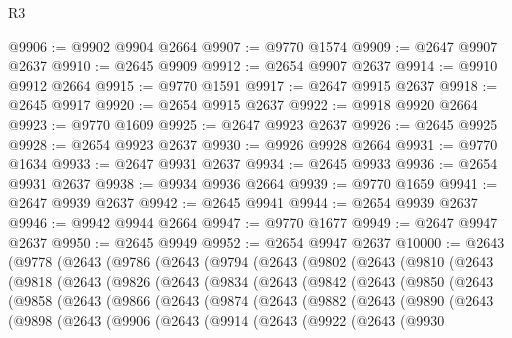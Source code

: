 \begin{lexlean}{R3}
\begin{coremodule}
@9906 := @9902 @9904 @2664
@9907 := @9770 @1574
@9909 := @2647 @9907 @2637
@9910 := @2645 @9909
@9912 := @2654 @9907 @2637
@9914 := @9910 @9912 @2664
@9915 := @9770 @1591
@9917 := @2647 @9915 @2637
@9918 := @2645 @9917
@9920 := @2654 @9915 @2637
@9922 := @9918 @9920 @2664
@9923 := @9770 @1609
@9925 := @2647 @9923 @2637
@9926 := @2645 @9925
@9928 := @2654 @9923 @2637
@9930 := @9926 @9928 @2664
@9931 := @9770 @1634
@9933 := @2647 @9931 @2637
@9934 := @2645 @9933
@9936 := @2654 @9931 @2637
@9938 := @9934 @9936 @2664
@9939 := @9770 @1659
@9941 := @2647 @9939 @2637
@9942 := @2645 @9941
@9944 := @2654 @9939 @2637
@9946 := @9942 @9944 @2664
@9947 := @9770 @1677
@9949 := @2647 @9947 @2637
@9950 := @2645 @9949
@9952 := @2654 @9947 @2637
@10000 := @2643
    (@9778
      (@2643
        (@9786
          (@2643
            (@9794
              (@2643
                (@9802
                  (@2643
                    (@9810
                      (@2643
                        (@9818
                          (@2643
                            (@9826
                              (@2643
                                (@9834
                                  (@2643
                                    (@9842
                                      (@2643
                                        (@9850
                                          (@2643
                                            (@9858
                                              (@2643
                                                (@9866
                                                  (@2643
                                                    (@9874
                                                      (@2643
                                                        (@9882
                                                          (@2643
                                                            (@9890
                                                              (@2643
                                                                (@9898
                                                                  (@2643
                                                                    (@9906
                                                                      (@2643
                                                                        (@9914
                                                                          (@2643
                                                                            (@9922
                                                                              (@2643
                                                                                (@9930

\end{coremodule}
\end{lexlean}

